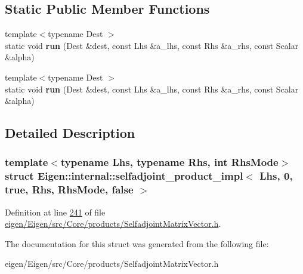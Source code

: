 \subsection*{Static Public Member Functions}
\begin{DoxyCompactItemize}
\item 
\mbox{\label{struct_eigen_1_1internal_1_1selfadjoint__product__impl_3_01_lhs_00_010_00_01true_00_01_rhs_00_01_rhs_mode_00_01false_01_4_a1606839a276bbdc3b514f7a63cab6f81}} 
{\footnotesize template$<$typename Dest $>$ }\\static void {\bfseries run} (Dest \&dest, const Lhs \&a\+\_\+lhs, const Rhs \&a\+\_\+rhs, const Scalar \&alpha)
\item 
\mbox{\label{struct_eigen_1_1internal_1_1selfadjoint__product__impl_3_01_lhs_00_010_00_01true_00_01_rhs_00_01_rhs_mode_00_01false_01_4_a1606839a276bbdc3b514f7a63cab6f81}} 
{\footnotesize template$<$typename Dest $>$ }\\static void {\bfseries run} (Dest \&dest, const Lhs \&a\+\_\+lhs, const Rhs \&a\+\_\+rhs, const Scalar \&alpha)
\end{DoxyCompactItemize}


\subsection{Detailed Description}
\subsubsection*{template$<$typename Lhs, typename Rhs, int Rhs\+Mode$>$\newline
struct Eigen\+::internal\+::selfadjoint\+\_\+product\+\_\+impl$<$ Lhs, 0, true, Rhs, Rhs\+Mode, false $>$}



Definition at line \hyperlink{eigen_2_eigen_2src_2_core_2products_2_selfadjoint_matrix_vector_8h_source_l00241}{241} of file \hyperlink{eigen_2_eigen_2src_2_core_2products_2_selfadjoint_matrix_vector_8h_source}{eigen/\+Eigen/src/\+Core/products/\+Selfadjoint\+Matrix\+Vector.\+h}.



The documentation for this struct was generated from the following file\+:\begin{DoxyCompactItemize}
\item 
eigen/\+Eigen/src/\+Core/products/\+Selfadjoint\+Matrix\+Vector.\+h\end{DoxyCompactItemize}
